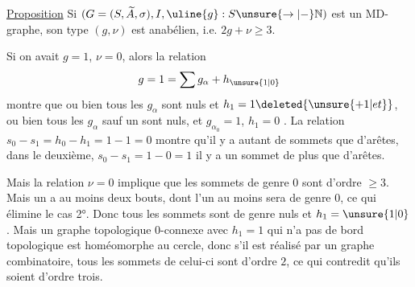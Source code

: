 \uline{Proposition} Si $(G=(S,\widetilde A,\sigma),I,\uline{g}:S\unsure{\to|-}\mathbb N)$ est un MD-graphe, son type $(g,\nu)$ est anabélien, i.e. $2g+\nu\geq3$.

Si on avait $g=1$, $\nu=0$, alors la relation
\[
g=1=\sum g_\alpha+h_{\unsure{1|0}}
\]
montre que ou bien tous les $g_\alpha$ sont nuls et $h_1=1\deleted{\unsure{+1|et}}$, ou bien tous les $g_\alpha$ sauf un  sont nuls, et $g_{\alpha_0}=1$, $h_1=0$ .  La relation $s_0-s_1=h_0-h_1=1-1=0$ montre qu'il y a autant de sommets que d'arêtes, dans le deuxième, $s_0-s_1=1-0=1$ il y a un sommet de plus que d'arêtes.

Mais la relation $\nu=0$ implique que les sommets de genre $0$ sont d'ordre $\geq3$.  Mais un   a au moins deux bouts, dont l'un au moins sera de genre $0$, ce qui élimine le cas 2°. Donc tous les sommets sont de genre nuls  et $h_1=\unsure{1|0}$. Mais  un graphe topologique $0$-connexe avec $h_1=1$ qui n'a pas de  bord topologique est homéomorphe au cercle, donc s'il est réalisé par un graphe combinatoire, tous les sommets de celui-ci sont d'ordre $2$, ce qui contredit qu'ils soient d'ordre trois.
